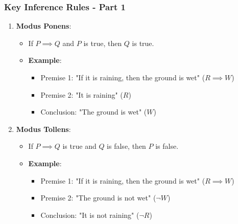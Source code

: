 \documentclass[aspectratio=169]{beamer}
\begin{document}
\begin{frame}[fragile]
    \frametitle{Key Inference Rules - Part 1}
    \begin{enumerate}
        \item \textbf{Modus Ponens}:
        \begin{itemize}
            \item If \( P \implies Q \) and \( P \) is true, then \( Q \) is true.
            \item \textbf{Example}:
            \begin{itemize}
                \item Premise 1: "If it is raining, then the ground is wet" (\( R \implies W \))
                \item Premise 2: "It is raining" (\( R \))
                \item Conclusion: "The ground is wet" (\( W \))
            \end{itemize}
        \end{itemize}
        \item \textbf{Modus Tollens}:
        \begin{itemize}
            \item If \( P \implies Q \) is true and \( Q \) is false, then \( P \) is false.
            \item \textbf{Example}:
            \begin{itemize}
                \item Premise 1: "If it is raining, then the ground is wet" (\( R \implies W \))
                \item Premise 2: "The ground is not wet" (\( \neg W \))
                \item Conclusion: "It is not raining" (\( \neg R \))
            \end{itemize}
        \end{itemize}
    \end{enumerate}
\end{frame}
\end{document}
